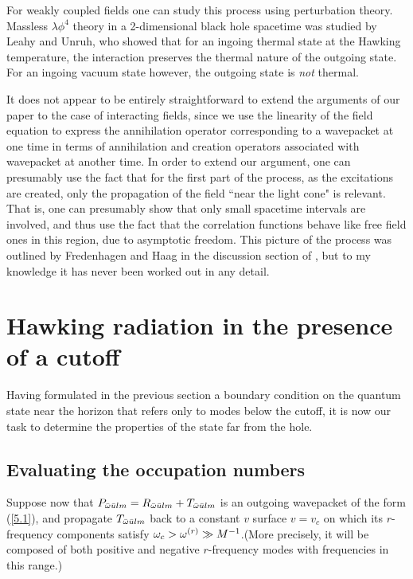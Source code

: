 For weakly coupled fields one can study this process using
perturbation theory. Massless $\lambda\phi^4$ theory in a
2-dimensional black hole spacetime was studied by Leahy and
Unruh\cite{LeahUn}, who showed that for an ingoing thermal
state at the Hawking temperature, the interaction preserves
the thermal nature of the outgoing state. For an ingoing
vacuum state however, the outgoing state is {\it not}
thermal.

It does not appear to be entirely straightforward to extend
the arguments of our paper to the case of interacting
fields, since we use the linearity of the field equation
to express the annihilation operator corresponding to a
wavepacket at one time in terms of annihilation and creation
operators associated with wavepacket at another time.
In order to extend our argument, one can presumably use the
fact that for the first part of the process, as the
excitations are created, only the propagation of the field
``near the light cone" is relevant. That is, one can
presumably show that only small spacetime intervals are
involved, and thus use the fact that the correlation
functions behave like free field ones in this region, due to
asymptotic freedom. This picture of the process was
outlined by Fredenhagen and Haag in the discussion section
of \cite{FredHaag}, but to my knowledge it has never been worked
out in any detail.

\section{Hawking radiation in the presence of a cutoff}
\label{sec:5}

Having formulated in the previous section a boundary condition on
the quantum state near the horizon that refers only to modes below the
cutoff, it is now our task to determine the properties of the state
far from the hole.

\subsection{Evaluating the occupation numbers}

Suppose now that
$P_{\bar{\omega}\bar{u} lm}= R_{\bar{\omega}\bar{u} lm}+ T_{\bar{\omega}\bar{u} lm}$ is
an outgoing wavepacket of
the form (\ref{5.1}), and
propagate $T_{\bar{\omega}\bar{u} lm}$ back to a constant $v$
surface $v=v_c$ on which its $r$-frequency
components satisfy $\omega_c>\omega^{(r)}\gg M^{-1}$.(More
precisely, it will be composed of both positive and negative
$r$-frequency modes with frequencies in this range.)

